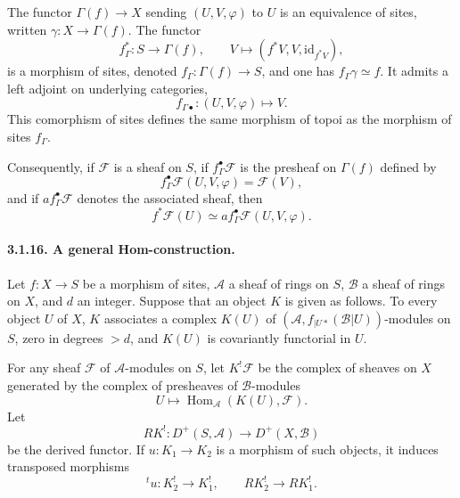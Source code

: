 \documentclass[12pt]{article}
\newcommand{\Aa}{\mathcal A}
\newcommand{\Bb}{\mathcal B}
\newcommand{\Ff}{\mathcal F}
\DeclareMathOperator{\Hom}{Hom}
\newcommand{\id}{\mathrm{id}}
\begin{document}
The functor $\Gamma(f)\to X$ sending $(U,V,\varphi)$ to $U$ is an equivalence of sites, written $\gamma:X\to\Gamma(f)$. The functor
\[
   f^*_{\Gamma}:S\longrightarrow\Gamma(f),\qquad
   V\longmapsto(f^*V,V,\id_{f^*V}),
\]
is a morphism of sites, denoted $f_\Gamma:\Gamma(f)\to S$, and one has $f_\Gamma\gamma\simeq f$. It admits a left adjoint on underlying categories,
\[
   f_{\Gamma\bullet}:(U,V,\varphi)\longmapsto V.
\]
This comorphism of sites defines the same morphism of topoi as the morphism of sites $f_\Gamma$.

Consequently, if $\Ff$ is a sheaf on $S$, if $f^\bullet_\Gamma\Ff$ is the presheaf on $\Gamma(f)$ defined by
\[
   f^\bullet_\Gamma\Ff(U,V,\varphi)=\Ff(V),
\]
and if $af^\bullet_\Gamma\Ff$ denotes the associated sheaf, then
\[
   f^*\Ff(U)\simeq af^\bullet_\Gamma\Ff(U,V,\varphi).
\]

\paragraph{3.1.16. A general Hom-construction.}
Let $f:X\to S$ be a morphism of sites, $\Aa$ a sheaf of rings on $S$, $\Bb$ a sheaf of rings on $X$, and $d$ an integer. Suppose that an object $K$ is given as follows. To every object $U$ of $X$, $K$ associates a complex $K(U)$ of $(\Aa,f_{|U*}(\Bb|U))$-modules on $S$, zero in degrees $>d$, and $K(U)$ is covariantly functorial in $U$.

For any sheaf $\Ff$ of $\Aa$-modules on $S$, let $K^!\Ff$ be the complex of sheaves on $X$ generated by the complex of presheaves of $\Bb$-modules
\[
   U\longmapsto \Hom_\Aa(K(U),\Ff).
\]
Let
\[
   RK^!:D^+(S,\Aa)\longrightarrow D^+(X,\Bb)
\]
be the derived functor. If $u:K_1\to K_2$ is a morphism of such objects, it induces transposed morphisms
\[
   {}^tu:K_2^!\longrightarrow K_1^!,\qquad RK_2^!\longrightarrow RK_1^!.
\]
\end{document}

